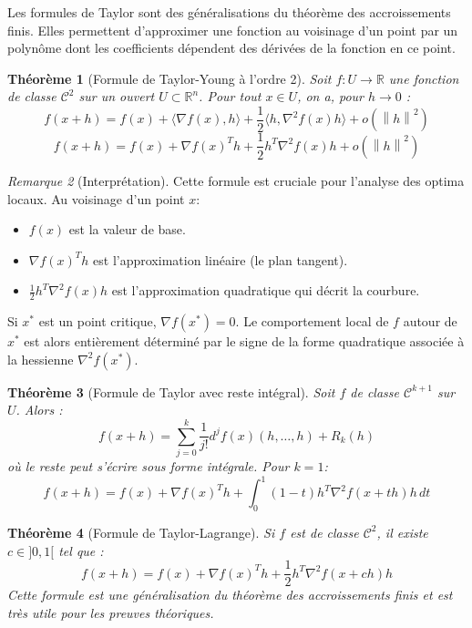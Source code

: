 \documentclass[a4paper,12pt,openany]{book}
\theoremstyle{plain}
\newtheorem{theorem}{Théorème}[section]
\theoremstyle{definition}
\theoremstyle{remark}
\newtheorem{remark}[theorem]{Remarque}
\theoremstyle{nbstyle}
\newcommand{\R}{\mathbb{R}}
\newcommand{\norm}[1]{\left\lVert#1\right\rVert}
\newcommand{\grad}{\nabla}
\newcommand{\hess}{\nabla^2}
\newcommand{\T}{^T}
\begin{document}
	Les formules de Taylor sont des généralisations du théorème des accroissements finis. Elles permettent d'approximer une fonction au voisinage d'un point par un polynôme dont les coefficients dépendent des dérivées de la fonction en ce point.
	
	\begin{theorem}[Formule de Taylor-Young à l'ordre 2]
		Soit $f: U \to \R$ une fonction de classe $\mathcal{C}^2$ sur un ouvert $U \subset \R^n$. Pour tout $x \in U$, on a, pour $h \to 0$ :
		$$ f(x+h) = f(x) + \langle \grad f(x), h \rangle + \frac{1}{2} \langle h, \hess f(x) h \rangle + o(\norm{h}^2) $$
		$$ f(x+h) = f(x) + \grad f(x)\T h + \frac{1}{2} h\T \hess f(x) h + o(\norm{h}^2) $$
	\end{theorem}
	
	\begin{remark}[Interprétation]
		Cette formule est cruciale pour l'analyse des optima locaux. Au voisinage d'un point $x$:
		\begin{itemize}
			\item $f(x)$ est la valeur de base.
			\item $\grad f(x)\T h$ est l'approximation linéaire (le plan tangent).
			\item $\frac{1}{2} h\T \hess f(x) h$ est l'approximation quadratique qui décrit la courbure.
		\end{itemize}
		Si $x^*$ est un point critique, $\grad f(x^*) = 0$. Le comportement local de $f$ autour de $x^*$ est alors entièrement déterminé par le signe de la forme quadratique associée à la hessienne $\hess f(x^*)$.
	\end{remark}
	
	\begin{theorem}[Formule de Taylor avec reste intégral]
		Soit $f$ de classe $\mathcal{C}^{k+1}$ sur $U$. Alors :
		$$ f(x+h) = \sum_{j=0}^k \frac{1}{j!} d^j f(x)(h, \dots, h) + R_k(h) $$
		où le reste peut s'écrire sous forme intégrale. Pour $k=1$:
		$$ f(x+h) = f(x) + \grad f(x)\T h + \int_0^1 (1-t) h\T \hess f(x+th) h \, dt $$
	\end{theorem}
	
	\begin{theorem}[Formule de Taylor-Lagrange]
		Si $f$ est de classe $\mathcal{C}^2$, il existe $c \in ]0, 1[$ tel que :
		$$ f(x+h) = f(x) + \grad f(x)\T h + \frac{1}{2} h\T \hess f(x+ch) h $$
		Cette formule est une généralisation du théorème des accroissements finis et est très utile pour les preuves théoriques.
	\end{theorem}
	
\end{document}
